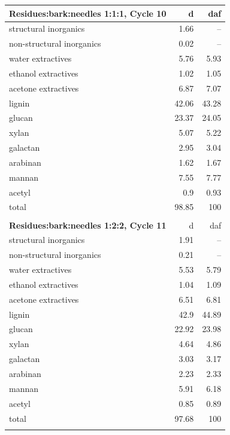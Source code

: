 \documentclass[12pt,titlepage]{article}
\begin{document}
\begin{longtable}{lrr}
    \textbf{Residues:bark:needles 1:1:1, Cycle 10} & d & daf \\
    \midrule
    structural inorganics     & 1.66  & -- \\
    non-structural inorganics & 0.02  & -- \\
    water extractives         & 5.76  & 5.93 \\
    ethanol extractives       & 1.02  & 1.05 \\
    acetone extractives       & 6.87  & 7.07 \\
    lignin                    & 42.06 & 43.28 \\
    glucan                    & 23.37 & 24.05 \\
    xylan                     & 5.07  & 5.22 \\
    galactan                  & 2.95  & 3.04 \\
    arabinan                  & 1.62  & 1.67 \\
    mannan                    & 7.55  & 7.77 \\
    acetyl                    & 0.9   & 0.93 \\
    total                     & 98.85 & 100 \\
    \\

    \textbf{Residues:bark:needles 1:2:2, Cycle 11} & d & daf \\
    \midrule
    structural inorganics     & 1.91  & -- \\
    non-structural inorganics & 0.21  & -- \\
    water extractives         & 5.53  & 5.79 \\
    ethanol extractives       & 1.04  & 1.09 \\
    acetone extractives       & 6.51  & 6.81 \\
    lignin                    & 42.9  & 44.89 \\
    glucan                    & 22.92 & 23.98 \\
    xylan                     & 4.64  & 4.86 \\
    galactan                  & 3.03  & 3.17 \\
    arabinan                  & 2.23  & 2.33 \\
    mannan                    & 5.91  & 6.18 \\
    acetyl                    & 0.85  & 0.89 \\
    total                     & 97.68 & 100 \\
    \\


\end{longtable}
\end{document}

